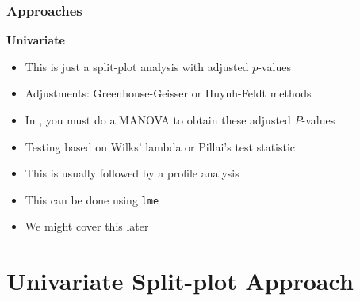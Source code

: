 \documentclass[color=usenames,dvipsnames]{beamer}\usepackage[]{graphicx}\usepackage[]{color}
\newcommand{\inr}[1]{\colorbox{inlinecolor}{\texttt{#1}}}
\begin{document}
\begin{frame}[fragile]
   \frametitle{Approaches}
      \large
      {\bf Univariate}
        \begin{itemize}
        \normalsize
          \item<1-> This is just a split-plot analysis with adjusted $p$-values
          \item<1-> Adjustments: Greenhouse-Geisser or Huynh-Feldt methods
          \item<1-> In \R, you must do a MANOVA to obtain these adjusted $P$-values
        \end{itemize}
      \vfill
        \begin{itemize}
          \large
          \item<2-> Testing based on Wilks' lambda or Pillai's test statistic
          \item<2-> This is usually followed by a profile analysis
        \end{itemize}
      \vfill
        \begin{itemize}
        \item<3-> This can be done using \inr{lme}
        \item<3-> We might cover this later%
      \end{itemize}
\end{frame}







\section{Univariate Split-plot Approach}
\end{document}
